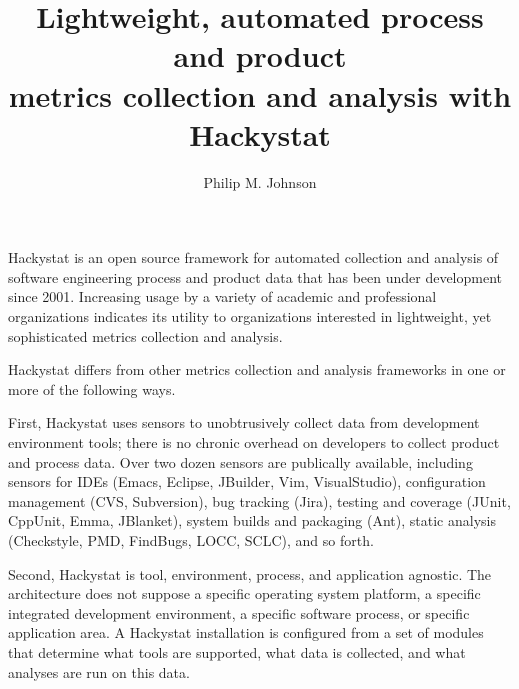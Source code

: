 \documentclass[runningheads]{llncs}
\begin{document}
\pagestyle{headings}
\mainmatter

\title{Lightweight, automated process and product\\
metrics collection and analysis with Hackystat}


\author{Philip M. Johnson}


\maketitle

Hackystat is an open source framework for automated collection and analysis
of software engineering process and product data that has been under
development since 2001. Increasing usage by a variety of academic and professional 
organizations indicates its utility to organizations interested in 
lightweight, yet sophisticated metrics collection and analysis.

Hackystat differs from other metrics collection and analysis frameworks in
one or more of the following ways.

First, Hackystat uses sensors to unobtrusively collect data from development
environment tools; there is no chronic overhead on developers to collect
product and process data. Over two dozen sensors are publically available,
including sensors for IDEs (Emacs, Eclipse, JBuilder, Vim, VisualStudio),
configuration management (CVS, Subversion), bug tracking (Jira), testing
and coverage (JUnit, CppUnit, Emma, JBlanket), system builds and packaging
(Ant), static analysis (Checkstyle, PMD, FindBugs, LOCC, SCLC), and so
forth.

Second, Hackystat is tool, environment, process, and application
agnostic. The architecture does not suppose a specific operating system
platform, a specific integrated development environment, a specific
software process, or specific application area. A Hackystat installation is
configured from a set of modules that determine what tools are supported,
what data is collected, and what analyses are run on this data.
\end{document}
